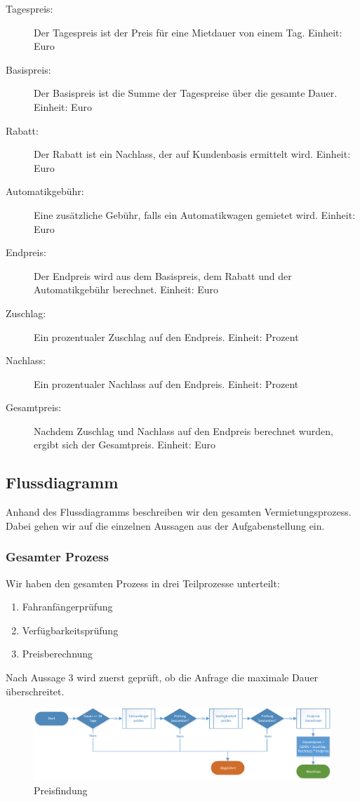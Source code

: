 \begin{description}
\begin{description}
		\end{description}
	\item[Tagespreis:] Der Tagespreis ist der Preis für eine Mietdauer von einem Tag. Einheit: Euro
	\item[Basispreis:] Der Basispreis ist die Summe der Tagespreise über die gesamte Dauer. Einheit: Euro
	\item[Rabatt:] Der Rabatt ist ein Nachlass, der auf Kundenbasis ermittelt wird. Einheit: Euro
	\item[Automatikgebühr:] Eine zusätzliche Gebühr, falls ein Automatikwagen gemietet wird. Einheit: Euro
	\item[Endpreis:] Der Endpreis wird aus dem Basispreis, dem Rabatt und der Automatikgebühr berechnet. Einheit: Euro
	\item[Zuschlag:] Ein prozentualer Zuschlag auf den Endpreis. Einheit: Prozent
	\item[Nachlass:] Ein prozentualer Nachlass auf den Endpreis. Einheit: Prozent
	\item[Gesamtpreis:] Nachdem Zuschlag und Nachlass auf den Endpreis berechnet wurden, ergibt sich der Gesamtpreis. Einheit: Euro
	
\end{description}

\subsection{Flussdiagramm}

Anhand des Flussdiagramms beschreiben wir den gesamten Vermietungsprozess. Dabei gehen wir auf
die einzelnen Aussagen aus der Aufgabenstellung ein.

\subsubsection{Gesamter Prozess}

Wir haben den gesamten Prozess in drei Teilprozesse unterteilt:
\begin{enumerate}
	\item Fahranfängerprüfung
	\item Verfügbarkeitsprüfung
	\item Preisberechnung
\end{enumerate}

Nach Aussage 3 wird zuerst geprüft, ob die Anfrage die maximale Dauer überschreitet.

\begin{figure}[tbh]
\centering
\includegraphics[width=1.0\linewidth]{Bilder/Preis_berechnen}
\caption{Preisfindung}
\label{fig:Preis_berechnen}
\end{figure}

